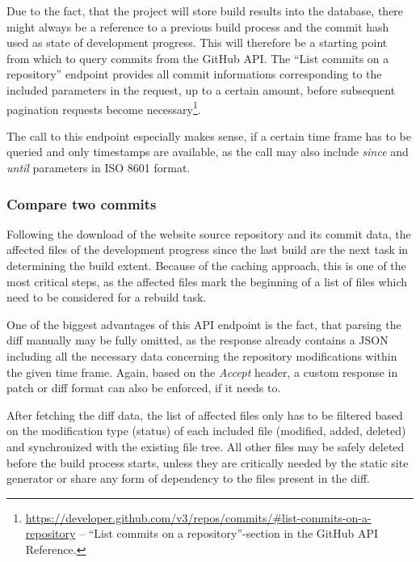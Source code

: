 Due to the fact, that the project will store build results into the database, there might always be a reference to a previous build process and the commit hash used as state of development progress. This will therefore be a starting point from which to query commits from the GitHub API. The ``List commits on a repository'' endpoint provides all commit informations corresponding to the included parameters in the request, up to a certain amount, before subsequent pagination requests become necessary\footnote{\url{https://developer.github.com/v3/repos/commits/\#list-commits-on-a-repository} -- ``List commits on a repository''-section in the GitHub API Reference.}.

The call to this endpoint especially makes sense, if a certain time frame has to be queried and only timestamps are available, as the call may also include \emph{since} and \emph{until} parameters in ISO 8601 format.

\subsubsection{Compare two commits}
Following the download of the website source repository and its commit data, the affected files of the development progress since the last build are the next task in determining the build extent. Because of the caching approach, this is one of the most critical steps, as the affected files mark the beginning of a list of files which need to be considered for a rebuild task.

One of the biggest advantages of this API endpoint is the fact, that parsing the diff manually may be fully omitted, as the response already contains a JSON including all the necessary data concerning the repository modifications within the given time frame. Again, based on the \emph{Accept} header, a custom response in patch or diff format can also be enforced, if it needs to.

After fetching the diff data, the list of affected files only has to be filtered based on the modification type (status) of each included file (modified, added, deleted) and synchronized with the existing file tree. All other files may be safely deleted before the build process starts, unless they are critically needed by the static site generator or share any form of dependency to the files present in the diff.
